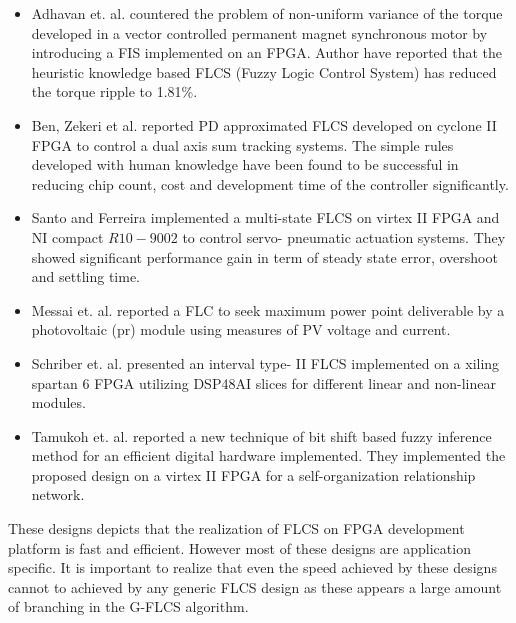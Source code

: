 \begin{itemize}
	\item Adhavan et. al. \cite{Adhavan2014a} countered the problem of non-uniform variance of the torque developed in a vector controlled permanent magnet synchronous motor by introducing a FIS implemented on an FPGA. Author have reported that the heuristic knowledge based FLCS (Fuzzy Logic Control System) has reduced the torque ripple to 1.81\%.
	\item Ben, Zekeri et al. \cite{Benzekri20146109} reported PD approximated FLCS developed on cyclone II FPGA to control a dual axis sum tracking systems.  The simple rules developed with human knowledge have been found to be successful in reducing chip count, cost and development time of the controller significantly.
	\item Santo and Ferreira \cite{Santos2014} implemented a multi-state FLCS on virtex II FPGA and NI compact $ R10-9002 $ to control servo- pneumatic actuation systems.  They showed significant performance gain in term of steady state error, overshoot and settling time.
	\item Messai et. al. \cite{Messai2011} reported a FLC to seek maximum power point deliverable by a photovoltaic (pr) module using measures of PV voltage and current.
	\item Schriber et. al. \cite{Schrieber2015}presented an interval type- II FLCS implemented on a xiling spartan 6 FPGA utilizing DSP48AI slices for different linear and non-linear modules.
	\item Tamukoh et. al. \cite{Tamukoh2007} reported a new technique of bit shift based fuzzy inference method for an efficient digital hardware implemented. They implemented the proposed design on a virtex II FPGA for a self-organization relationship network. 
\end{itemize}
	These designs depicts that the realization of FLCS on FPGA development platform is fast and efficient. However most of these designs are application specific. It is important to realize that even  the speed achieved by these designs cannot to achieved by any generic FLCS design as these appears a large amount of branching in the G-FLCS algorithm.	
